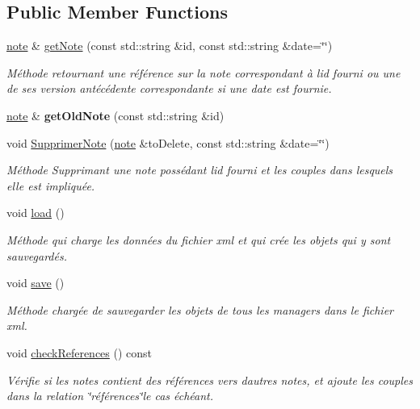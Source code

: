\subsection*{Public Member Functions}
\begin{DoxyCompactItemize}
\item 
\hyperlink{classnote}{note} \& \hyperlink{class_notes_manager2_a53819d123894c31bbbab66b3d0bf0ff0}{get\+Note} (const std\+::string \&id, const std\+::string \&date=\char`\"{}\char`\"{})
\begin{DoxyCompactList}\small\item\em Méthode retournant une référence sur la note correspondant à l\textquotesingle{}id fourni ou une de ses version antécédente correspondante si une date est fournie. \end{DoxyCompactList}\item 
\mbox{\label{class_notes_manager2_ab3812fc5ddfbefa0a03fb2e1f958fd2e}} 
\hyperlink{classnote}{note} \& {\bfseries get\+Old\+Note} (const std\+::string \&id)
\item 
void \hyperlink{class_notes_manager2_ac020f8488f0f71f92de1e8131a64d943}{Supprimer\+Note} (\hyperlink{classnote}{note} \&to\+Delete, const std\+::string \&date=\char`\"{}\char`\"{})
\begin{DoxyCompactList}\small\item\em Méthode Supprimant une note possédant l\textquotesingle{}id fourni et les couples dans lesquels elle est impliquée. \end{DoxyCompactList}\item 
void \hyperlink{class_notes_manager2_a2248b5b1620b2039fdba9b3c6476c6cc}{load} ()
\begin{DoxyCompactList}\small\item\em Méthode qui charge les données du fichier xml et qui crée les objets qui y sont sauvegardés. \end{DoxyCompactList}\item 
void \hyperlink{class_notes_manager2_a03224a8a150d7d7a40a6633ab2afc7c0}{save} ()
\begin{DoxyCompactList}\small\item\em Méthode chargée de sauvegarder les objets de tous les managers dans le fichier xml. \end{DoxyCompactList}\item 
\mbox{\label{class_notes_manager2_a41ec18388f556565d78794ae042511b2}} 
void \hyperlink{class_notes_manager2_a41ec18388f556565d78794ae042511b2}{check\+References} () const
\begin{DoxyCompactList}\small\item\em Vérifie si les notes contient des références vers d\textquotesingle{}autres notes, et ajoute les couples dans la relation \char`\"{}références\char`\"{}le cas échéant. \end{DoxyCompactList}\end{DoxyCompactItemize}
